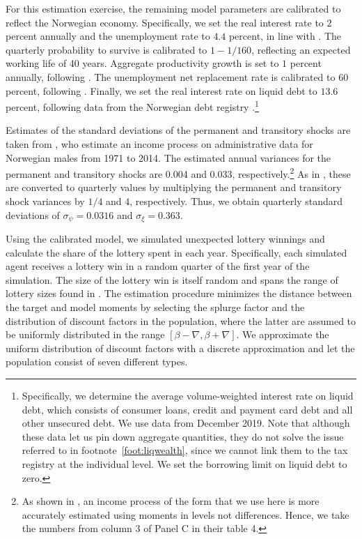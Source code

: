 \documentclass[\PathToRoot/\ProjectName]{subfiles}
\begin{document}


For this estimation exercise, the remaining model parameters are calibrated to reflect the Norwegian economy.
Specifically, we set the real interest rate to $2$ percent annually and the unemployment rate to $4.4$ percent, in line with \cite{aursland-state-dependent-2020}.
The quarterly probability to survive is calibrated to $1-1/160$, reflecting an expected working life of 40 years.
Aggregate productivity growth is set to $1$ percent annually, following \cite{kravik-navigating-2019}.
The unemployment net replacement rate is calibrated to $60$ percent, following \cite{oecdReplacement}.
Finally, we set the real interest rate on liquid debt to $13.6$ percent, following data from the Norwegian debt registry \cite{gjeldsregistret-nokkeltall-2022}.\footnote{Specifically, we determine the average volume-weighted interest rate on liquid debt, which consists of consumer loans, credit and payment card debt and all other unsecured debt.
  We use data from December 2019.
  Note that although these data let us pin down aggregate quantities, they do not solve the issue referred to in footnote~\ref{foot:liqwealth}, since we cannot link them to the tax registry at the individual level.
  We set the borrowing limit on liquid debt to zero.}

Estimates of the standard deviations of the permanent and transitory shocks are taken from \cite{crawley2024Parsimonious}, who estimate an income process on administrative data for Norwegian males from 1971 to 2014.
The estimated annual variances for the permanent and transitory shocks are 0.004 and 0.033, respectively.\footnote{As shown in \cite{crawley2024Parsimonious}, an income process of the form that we use here is more accurately estimated using moments in levels not differences.
  Hence, we take the numbers from column 3 of Panel C in their table 4.} As in \cite{carroll2020sticky}, these are converted to quarterly values by multiplying the permanent and transitory shock variances by $1/4$ and $4$, respectively.
Thus, we obtain quarterly standard deviations of $\sigma_\psi=0.0316$ and $\sigma_\xi=0.363$.

Using the calibrated model, we simulated unexpected lottery winnings and calculate the share of the lottery spent in each year.
Specifically, each simulated agent receives a lottery win in a random quarter of the first year of the simulation.
The size of the lottery win is itself random and spans the range of lottery sizes found in \cite{fagereng-mpc-2021}.
The estimation procedure minimizes the distance between the target and model moments by selecting the splurge factor and the distribution of discount factors in the population, where the latter are assumed to be uniformly distributed in the range $[\beta-\nabla, \beta+\nabla]$.
We approximate the uniform distribution of discount factors with a discrete approximation and let the population consist of seven different types.
\end{document}
